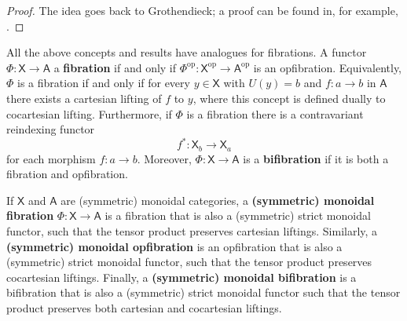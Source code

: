 \documentclass[ a4paper, onecolumn, superscriptaddress,10pt, accepted=2022-02-14, issue=3, volume=4, shorttitle=papers/compositionality-4-3 ]{compositionalityarticle}
\newcommand{\op}{^{\mathrm{op}}}
\let\maps\colon
\newcommand{\A}{\mathsf{A}}
\newcommand{\X}{\mathsf{X}}
\newcommand{\define}[1]{{\rm \textbf{#1}}}
\begin{document}
\begin{proof}
The idea goes back to Grothendieck; a proof can be found in, for example, \cite[Section 1.10]{Jacobs}.
\end{proof}

All the above concepts and results have analogues for fibrations.   A functor $\Phi \maps \X \to \A$ a \define{fibration} if and only if $\Phi\op \maps \X\op \to \A\op$ is an opfibration.  Equivalently, $\Phi$ is a fibration if and only if for every $y \in \X$ with $U(y) = b$ and $f \maps a \to b$ in $\A$ there exists a cartesian lifting of $f$ to $y$, where this concept is defined dually to cocartesian lifting.     Furthermore, if $\Phi$ is a fibration there is a contravariant reindexing functor
\[    f^\ast \maps \X_b \to \X_a \]
for each morphism $f \maps a \to b$.  Moreover, $\Phi\colon\X\to\A$ is a \define{bifibration} if it is both a fibration and opfibration.

If $\X$ and $\A$ are (symmetric) monoidal categories, a \define{(symmetric) monoidal fibration} $\Phi \maps \X \to \A$ is a fibration that is also a (symmetric) strict monoidal functor, such that the tensor product preserves cartesian liftings.  Similarly, a \define{(symmetric) monoidal opfibration} is an opfibration that is also a (symmetric) strict monoidal functor, such that the tensor product preserves cocartesian liftings.   Finally, a \define{(symmetric) monoidal bifibration} is a bifibration that is also a (symmetric) strict monoidal functor such that the tensor product preserves both cartesian and cocartesian liftings.
\end{document}
